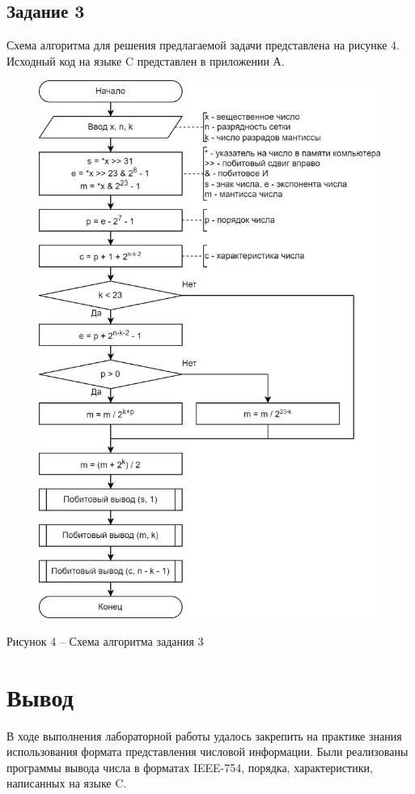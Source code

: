 \documentclass[a4paper,14pt]{extarticle}
\begin{document}
  \subsection*{Задание 3}
  Схема алгоритма для решения предлагаемой задачи представлена на рисунке 4. Исходный код на языке C представлен в приложении А.
  \begin{figure}[h]
    \centering
    \includegraphics[width=0.6\linewidth]{schemes/s-3}
  \end{figure}
  \begin{center}
    Рисунок 4 – Схема алгоритма задания 3
  \end{center}

  \section*{Вывод}
  В ходе выполнения лабораторной работы удалось закрепить на практике знания использования формата представления числовой информации. Были реализованы программы вывода числа в форматах IEEE-754, порядка, характеристики, написанных на языке C.

  \newpage
\end{document}
